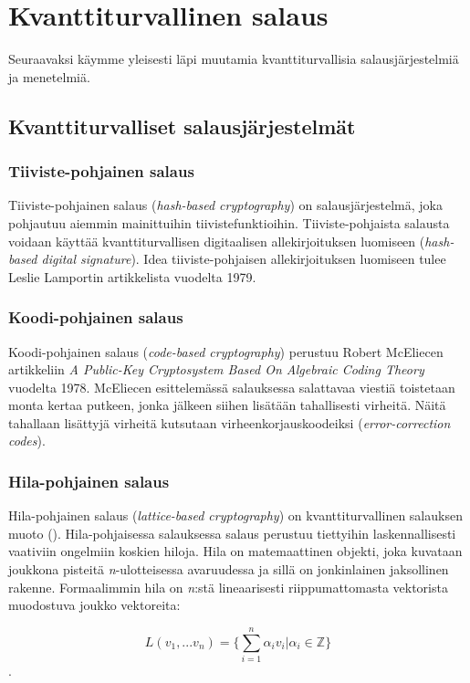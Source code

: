 \chapter{Kvanttiturvallinen salaus\label{results}}
Seuraavaksi käymme yleisesti läpi muutamia kvanttiturvallisia salausjärjestelmiä ja menetelmiä.

\section{Kvanttiturvalliset salausjärjestelmät}

\subsection{Tiiviste-pohjainen salaus}
Tiiviste-pohjainen salaus (\emph{hash-based cryptography}) on salausjärjestelmä, joka pohjautuu aiemmin mainittuihin tiivistefunktioihin. Tiiviste-pohjaista salausta voidaan käyttää kvanttiturvallisen digitaalisen allekirjoituksen luomiseen (\emph{hash-based digital signature}). Idea tiiviste-pohjaisen allekirjoituksen luomiseen tulee Leslie Lamportin artikkelista vuodelta 1979.

\subsection{Koodi-pohjainen salaus}
Koodi-pohjainen salaus (\emph{code-based cryptography}) perustuu Robert McEliecen artikkeliin \emph{A Public-Key Cryptosystem Based On Algebraic Coding Theory} vuodelta 1978. McEliecen esittelemässä salauksessa salattavaa viestiä toistetaan monta kertaa putkeen, jonka jälkeen siihen lisätään tahallisesti virheitä. Näitä tahallaan lisättyjä virheitä kutsutaan virheenkorjauskoodeiksi (\emph{error-correction codes}).

\subsection{Hila-pohjainen salaus}
Hila-pohjainen salaus (\emph{lattice-based cryptography}) on kvanttiturvallinen salauksen muoto (\cite{regev2006lattice}). Hila-pohjaisessa salauksessa salaus perustuu tiettyihin laskennallisesti vaativiin ongelmiin koskien hiloja. Hila on matemaattinen objekti, joka kuvataan joukkona pisteitä \emph{n}-ulotteisessa avaruudessa ja sillä on jonkinlainen jaksollinen rakenne. Formaalimmin hila on \emph{n}:stä lineaarisesti riippumattomasta vektorista muodostuva joukko vektoreita: 

\[L(v_1,...v_n) =\Bigg\{ {\sum_{i=1}^{n}\alpha_i 
v_i|\alpha_i \in \mathbb{Z}} \Bigg\}\]. 

